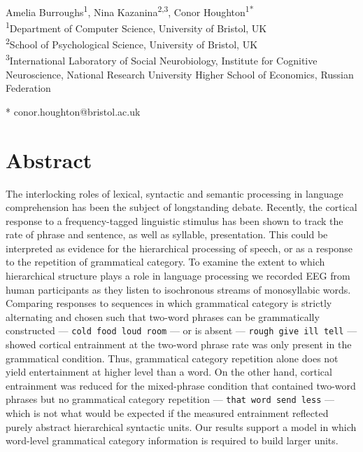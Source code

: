 \documentclass[11pt,a4wide]{article}
\date{}
\begin{document}
\vspace*{0.2in}

\begin{flushleft}
{\Large
\textbf{} 
}
\newline
\\
Amelia Burroughs\textsuperscript{1},
Nina Kazanina\textsuperscript{2,3},
Conor Houghton\textsuperscript{1*}
\\
\bigskip
\textsuperscript{1}Department of Computer Science, University of
Bristol, UK\\ \textsuperscript{2}School of Psychological Science,
University of Bristol, UK\\ \textsuperscript{3}International
Laboratory of Social Neurobiology, Institute for Cognitive
Neuroscience, National Research University Higher School of Economics,
Russian Federation \\
\bigskip

* conor.houghton@bristol.ac.uk

\end{flushleft}


\section*{Abstract}

The interlocking roles of lexical, syntactic and semantic processing
in language comprehension has been the subject of longstanding
debate. Recently, the cortical response to a frequency-tagged
linguistic stimulus has been shown to track the rate of phrase and
sentence, as well as syllable, presentation. This could be interpreted
as evidence for the hierarchical processing of speech, or as a
response to the repetition of grammatical category. To examine the
extent to which hierarchical structure plays a role in language
processing we recorded EEG from human participants as they listen to
isochronous streams of monosyllabic words. Comparing responses to
sequences in which grammatical category is strictly alternating and
chosen such that two-word phrases can be grammatically constructed ---
\texttt{cold food loud room} --- or is absent --- \texttt{rough give
  ill tell} --- showed cortical entrainment at the two-word phrase
rate was only present in the grammatical condition. Thus, grammatical
category repetition alone does not yield entertainment at higher level
than a word. On the other hand, cortical entrainment was reduced for
the mixed-phrase condition that contained two-word phrases but no
grammatical category repetition --- \texttt{that word send less} ---
which is not what would be expected if the measured entrainment
reflected purely abstract hierarchical syntactic units. Our results
support a model in which word-level grammatical category information
is required to build larger units.
\end{document}
